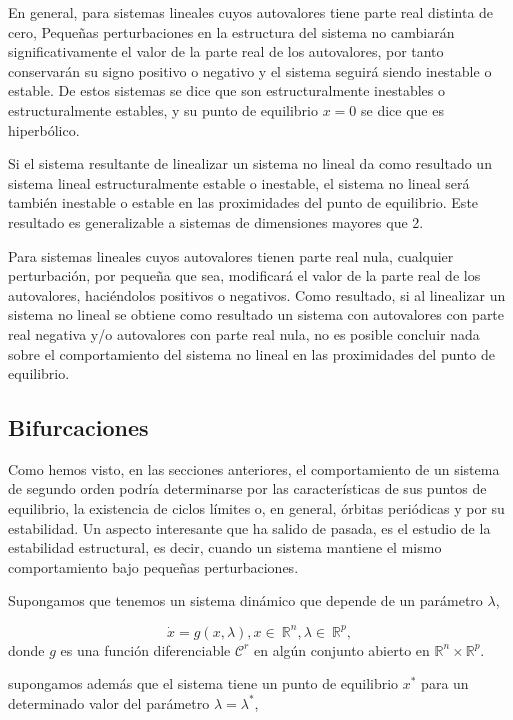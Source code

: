 En general, para sistemas lineales cuyos autovalores tiene parte real distinta de cero, Pequeñas perturbaciones en la estructura del sistema no cambiarán significativamente el valor de la parte real de los autovalores, por tanto conservarán su signo positivo o negativo y el sistema seguirá siendo inestable o estable. De estos sistemas se dice que son estructuralmente inestables o estructuralmente estables, y su punto de equilibrio $x=0$ se dice que es hiperbólico. 

Si el sistema resultante de linealizar un sistema no lineal da como resultado un sistema lineal estructuralmente estable o inestable, el sistema no lineal será también inestable o estable en las proximidades del punto de equilibrio. Este resultado es generalizable a sistemas de dimensiones mayores que 2.

Para  sistemas lineales cuyos autovalores tienen parte real nula, cualquier perturbación, por pequeña que sea, modificará el valor de la parte real de los autovalores, haciéndolos positivos o negativos. Como resultado, si al linealizar un sistema no lineal se obtiene como resultado un sistema con autovalores con parte real negativa y/o  autovalores con parte real nula, no es posible concluir nada sobre el comportamiento del sistema no lineal en las proximidades del punto de equilibrio. 

\subsection{Bifurcaciones}

Como hemos visto, en las secciones anteriores, el comportamiento de un sistema de segundo orden podría determinarse por las características de sus puntos de equilibrio, la existencia de ciclos límites o, en general, órbitas periódicas y por su estabilidad.
Un aspecto interesante que ha salido de pasada, es el estudio de la estabilidad estructural, es decir,  cuando un sistema mantiene el mismo comportamiento bajo pequeñas perturbaciones.

Supongamos que tenemos un sistema dinámico que depende de un parámetro $\lambda$,

\begin{equation}
\dot x = g(x,\lambda), x \in \ \mathbb{R}^n, \lambda \in \ \mathbb{R}^p,
\end{equation}
donde $g$ es una función diferenciable $\mathcal{C}^r$ en algún conjunto abierto en $ \mathbb{R}^n \times  \mathbb{R}^p$.

supongamos además que el sistema tiene un punto de equilibrio $x^*$ para un determinado valor del parámetro $\lambda = \lambda^*$,

